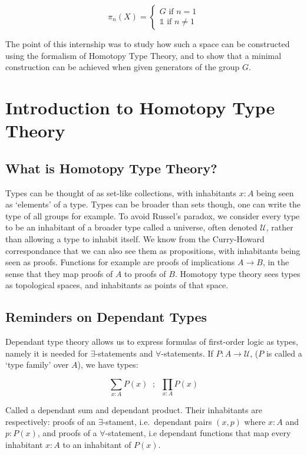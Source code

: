 \documentclass{article}
\begin{document}
\[
\pi_{n}(X) =
\begin{cases}
  G \text{ if } n = 1 \\
  \mathbb{1} \text{ if } n \neq 1
\end{cases}
\]

The point of this internship was to study how such a space can be constructed using the formalism of Homotopy Type Theory, and to show that a minimal construction can be achieved when given generators of the group $G$.

\section{Introduction to Homotopy Type Theory}

\subsection{What is Homotopy Type Theory?}

Types can be thought of as set-like collections, with inhabitants $x : A$ being seen as `elements' of a type. Types can be broader than sets though, one can write the type of all groups for example. To avoid Russel's paradox, we consider every type to be an inhabitant of a broader type called a universe, often denoted $\mathcal{U}$, rather than allowing a type to inhabit itself. We know from the Curry-Howard correspondance that we can also see them as propositions, with inhabitants being seen as proofs. Functions for example are proofs of implications $A \to B$, in the sense that they map proofs of $A$ to proofs of $B$. Homotopy type theory sees types as topological spaces, and inhabitants as points of that space.


\subsection{Reminders on Dependant Types}

Dependant type theory allows us to express formulas of first-order logic as types, namely it is needed for $\exists$-statements and $\forall$-statements. If $P : A \to \mathcal{U}$, ($P$ is called a `type family' over $A$), we have types:

\[\sum_{x : A}P(x) \; \; ; \; \; \prod_{x : A}P(x) \]

Called a dependant sum and dependant product. Their inhabitants are respectively: proofs of an $\exists$-stament, i.e.\ dependant pairs $(x , p)$ where $x : A$ and $p : P(x)$, and proofs of a $\forall$-statement, i.e dependant functions that map every inhabitant $x : A$ to an inhabitant of $P(x)$.
\end{document}
